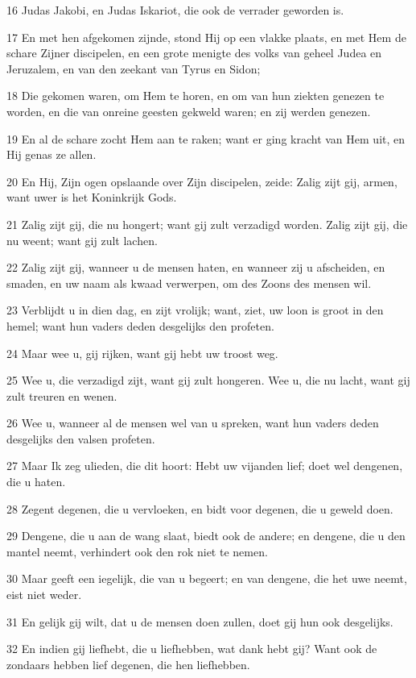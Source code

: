 \par 16 Judas Jakobi, en Judas Iskariot, die ook de verrader geworden is.
\par 17 En met hen afgekomen zijnde, stond Hij op een vlakke plaats, en met Hem de schare Zijner discipelen, en een grote menigte des volks van geheel Judea en Jeruzalem, en van den zeekant van Tyrus en Sidon;
\par 18 Die gekomen waren, om Hem te horen, en om van hun ziekten genezen te worden, en die van onreine geesten gekweld waren; en zij werden genezen.
\par 19 En al de schare zocht Hem aan te raken; want er ging kracht van Hem uit, en Hij genas ze allen.
\par 20 En Hij, Zijn ogen opslaande over Zijn discipelen, zeide: Zalig zijt gij, armen, want uwer is het Koninkrijk Gods.
\par 21 Zalig zijt gij, die nu hongert; want gij zult verzadigd worden. Zalig zijt gij, die nu weent; want gij zult lachen.
\par 22 Zalig zijt gij, wanneer u de mensen haten, en wanneer zij u afscheiden, en smaden, en uw naam als kwaad verwerpen, om des Zoons des mensen wil.
\par 23 Verblijdt u in dien dag, en zijt vrolijk; want, ziet, uw loon is groot in den hemel; want hun vaders deden desgelijks den profeten.
\par 24 Maar wee u, gij rijken, want gij hebt uw troost weg.
\par 25 Wee u, die verzadigd zijt, want gij zult hongeren. Wee u, die nu lacht, want gij zult treuren en wenen.
\par 26 Wee u, wanneer al de mensen wel van u spreken, want hun vaders deden desgelijks den valsen profeten.
\par 27 Maar Ik zeg ulieden, die dit hoort: Hebt uw vijanden lief; doet wel dengenen, die u haten.
\par 28 Zegent degenen, die u vervloeken, en bidt voor degenen, die u geweld doen.
\par 29 Dengene, die u aan de wang slaat, biedt ook de andere; en dengene, die u den mantel neemt, verhindert ook den rok niet te nemen.
\par 30 Maar geeft een iegelijk, die van u begeert; en van dengene, die het uwe neemt, eist niet weder.
\par 31 En gelijk gij wilt, dat u de mensen doen zullen, doet gij hun ook desgelijks.
\par 32 En indien gij liefhebt, die u liefhebben, wat dank hebt gij? Want ook de zondaars hebben lief degenen, die hen liefhebben.
